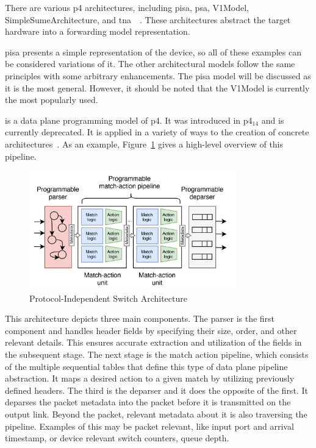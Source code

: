 There are various \gls{p4} architectures, including \gls{pisa}, \gls{psa}, V1Model, SimpleSumeArchitecture, and \gls{tna}~\cite{peterson_software-defined_2021}~\cite{hauser_survey_2021}. These architectures abstract the target hardware into a forwarding model representation. 

\gls{pisa} presents a simple representation of the device, so all of these examples can be considered variations of it. The other architectural models follow the same principles with some arbitrary enhancements. The \gls{pisa} model will be discussed as it is the most general. However, it should be noted that the V1Model is currently the most popularly used.

 is a data plane programming model of \gls{p4}. It was introduced in \gls{p4}$_{14}$ and is currently deprecated. It is applied in a variety of ways to the creation of concrete architectures~\cite{hauser_survey_2021}. As an example, Figure~\ref{fig:pisa_pipeline} gives a high-level overview of this pipeline. 

\begin{figure}
	\centering
	\includegraphics[width=0.8\textwidth]{Chapters/Figures/SDNs/pisa_pipeline.png}
	\caption{Protocol-Independent Switch Architecture~\cite{hauser_survey_2021}}
	\label{fig:pisa_pipeline}
\end{figure}

This architecture depicts three main components. The parser is the first component and handles header fields by specifying their size, order, and other relevant details. This ensures accurate extraction and utilization of the fields in the subsequent stage. The next stage is the match action pipeline, which consists of the multiple sequential tables that define this type of data plane pipeline abstraction. It maps a desired action to a given match by utilizing previously defined headers. The third is the deparser and it does the opposite of the first. It deparses the packet metadata into the packet before it is transmitted on the output link. Beyond the packet, relevant metadata about it is also traversing the pipeline. Examples of this may be packet relevant, like input port and arrival timestamp, or device relevant switch counters, queue depth. 

